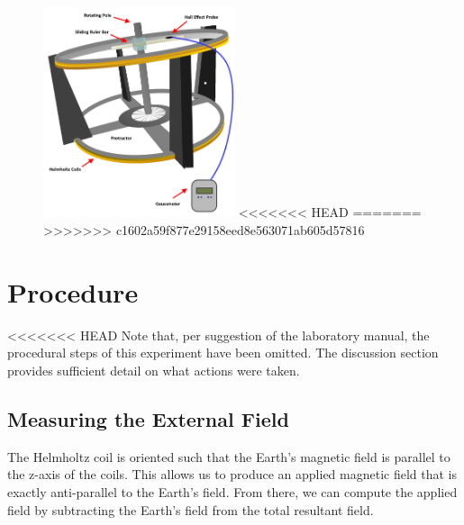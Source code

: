 \documentclass[a4paper]{article}
\begin{document}
\begin{figure}[h]
\centering
\includegraphics[width=0.5\textwidth]{helmholtz_diagram.png}
<<<<<<< HEAD
=======
>>>>>>> c1602a59f877e29158eed8e563071ab605d57816
\label{helmholtz_diagram}
\end{figure}

\section{Procedure}

<<<<<<< HEAD
Note that, per suggestion of the laboratory manual, the procedural
steps of this experiment have been omitted. The discussion section
provides sufficient detail on what actions were taken.

\subsection{Measuring the External Field}
The Helmholtz coil is oriented such that the Earth's magnetic field is
parallel to the z-axis of the coils. This allows us to produce an
applied magnetic field that is exactly anti-parallel to the Earth's
field. From there, we can compute the applied field by subtracting the
Earth's field from the total resultant field.
\end{document}
